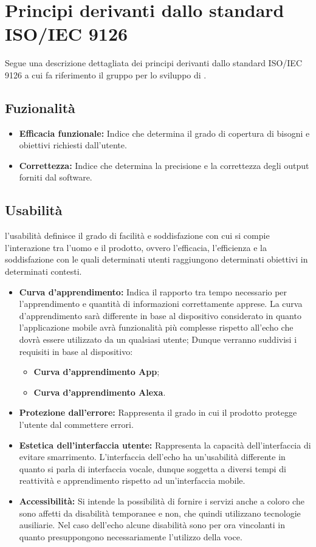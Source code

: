 \chapter{Principi derivanti dallo standard ISO/IEC 9126}
Segue una descrizione dettagliata dei principi derivanti dallo standard ISO/IEC 9126 a cui fa riferimento il gruppo per lo sviluppo di .

\section{Fuzionalità}
\begin{itemize}
	\item \textbf{Efficacia funzionale:} Indice che determina il grado di copertura di bisogni e obiettivi richiesti dall'utente.
	\item \textbf{Correttezza:} Indice che determina la precisione e la correttezza degli output forniti dal software.
\end{itemize}
\section{Usabilità}
l'usabilità definisce il grado di facilità e soddisfazione con cui si compie l'interazione tra l'uomo e il prodotto, ovvero l'efficacia, l'efficienza e la soddisfazione con le quali determinati utenti raggiungono determinati obiettivi in determinati contesti.
\begin{itemize}
	\item \textbf{Curva d'apprendimento:} Indica il rapporto tra tempo necessario per l'apprendimento e quantità di informazioni correttamente apprese.
	La curva d'apprendimento sarà differente in base al dispositivo considerato in quanto l'applicazione mobile avrà funzionalità più complesse rispetto all'echo che dovrà essere utilizzato da un qualsiasi utente;
	Dunque verranno suddivisi i requisiti in base al dispositivo:
	\begin{itemize}
		\item \textbf{Curva d'apprendimento App};
		\item \textbf{Curva d'apprendimento Alexa}.
	\end{itemize}
	\item \textbf{Protezione dall'errore:} Rappresenta il grado in cui il prodotto protegge l'utente dal commettere errori.
	\item \textbf{Estetica dell'interfaccia utente:} Rappresenta la capacità dell'interfaccia di evitare smarrimento.
	L'interfaccia dell'echo ha un'usabilità differente  in quanto si parla di interfaccia vocale, dunque soggetta a diversi tempi di reattività e apprendimento rispetto ad un'interfaccia mobile.
	\item \textbf{Accessibilità:}  Si intende la possibilità di fornire i servizi anche a coloro che sono affetti da disabilità temporanee e non, che quindi utilizzano tecnologie ausiliarie.
	Nel caso dell'echo alcune disabilità sono per ora vincolanti in quanto presuppongono necessariamente l'utilizzo della voce.
\end{itemize}
